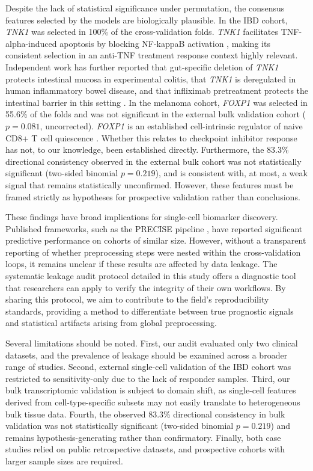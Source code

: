 \documentclass{bmcart}
\begin{document}
Despite the lack of statistical significance under permutation, the consensus features selected by the models are biologically plausible. In the IBD cohort, \textit{TNK1} was selected in 100\% of the cross-validation folds. \textit{TNK1} facilitates TNF-alpha-induced apoptosis by blocking NF-kappaB activation \cite{azoitei}, making its consistent selection in an anti-TNF treatment response context highly relevant. Independent work has further reported that gut-specific deletion of \textit{TNK1} protects intestinal mucosa in experimental colitis, that \textit{TNK1} is deregulated in human inflammatory bowel disease, and that infliximab pretreatment protects the intestinal barrier in this setting \cite{armacki}. In the melanoma cohort, \textit{FOXP1} was selected in 55.6\% of the folds and was not significant in the external bulk validation cohort ($p = 0.081$, uncorrected). \textit{FOXP1} is an established cell-intrinsic regulator of naive CD8+ T cell quiescence \cite{feng}. Whether this relates to checkpoint inhibitor response has not, to our knowledge, been established directly. Furthermore, the 83.3\% directional consistency observed in the external bulk cohort was not statistically significant (two-sided binomial $p = 0.219$), and is consistent with, at most, a weak signal that remains statistically unconfirmed. However, these features must be framed strictly as hypotheses for prospective validation rather than conclusions.

These findings have broad implications for single-cell biomarker discovery. Published frameworks, such as the PRECISE pipeline \cite{pinhasi}, have reported significant predictive performance on cohorts of similar size. However, without a transparent reporting of whether preprocessing steps were nested within the cross-validation loops, it remains unclear if these results are affected by data leakage. The systematic leakage audit protocol detailed in this study offers a diagnostic tool that researchers can apply to verify the integrity of their own workflows. By sharing this protocol, we aim to contribute to the field's reproducibility standards, providing a method to differentiate between true prognostic signals and statistical artifacts arising from global preprocessing.

Several limitations should be noted. First, our audit evaluated only two clinical datasets, and the prevalence of leakage should be examined across a broader range of studies. Second, external single-cell validation of the IBD cohort was restricted to sensitivity-only due to the lack of responder samples. Third, our bulk transcriptomic validation is subject to domain shift, as single-cell features derived from cell-type-specific subsets may not easily translate to heterogeneous bulk tissue data. Fourth, the observed 83.3\% directional consistency in bulk validation was not statistically significant (two-sided binomial $p = 0.219$) and remains hypothesis-generating rather than confirmatory. Finally, both case studies relied on public retrospective datasets, and prospective cohorts with larger sample sizes are required.
\end{document}
